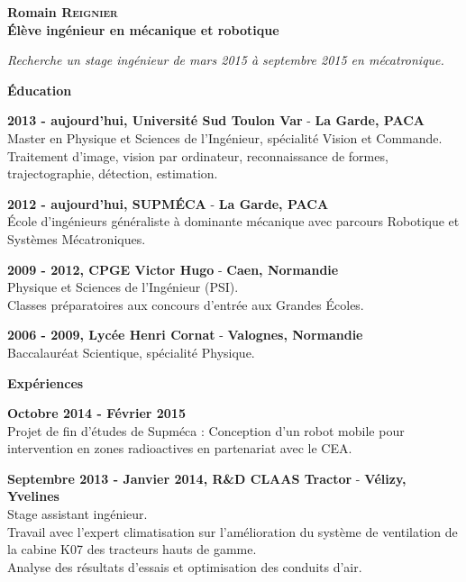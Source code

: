 \documentclass[a4paper,11pt,final]{memoir}
\newcommand{\Sep}{\vspace{1.5em}}
\newcommand{\SmallSep}{\vspace{0.5em}}
\newenvironment{AboutMe}
	{\ignorespaces%
}
	{\Sep\ignorespacesafterend}
\newcommand{\CVSection}[1]
	{\Large\textbf{#1}\par
	\SmallSep\normalsize\normalfont}
\newcommand{\CVItem}[1]
	{\textbf{\color{RoyalBlue} #1}\normalsize\normalfont}
\newcommand{\city}[1]
	{{\small\textbf{#1}}\normalsize\normalfont}
\begin{document}
\Huge\bfseries {\color{RoyalBlue} Romain \textsc{Reignier}} \\
\Large\bfseries  Élève ingénieur en mécanique et robotique\\

\normalsize\normalfont

\begin{AboutMe}
\emph{Recherche un stage ingénieur de mars 2015 à septembre 2015 en mécatronique.}
\end{AboutMe}

\CVSection{Éducation}

\CVItem{2013 - aujourd'hui, Université Sud Toulon Var} - \city{La Garde, PACA}\\
Master en Physique et Sciences de l'Ingénieur, spécialité Vision et Commande.\\
Traitement d'image, vision par ordinateur, reconnaissance de formes, trajectographie, détection, estimation.\\
\SmallSep

\CVItem{2012 - aujourd'hui, SUPMÉCA} - \city{La Garde, PACA}\\
École d'ingénieurs généraliste à dominante mécanique avec parcours Robotique et Systèmes Mécatroniques.
\SmallSep

\CVItem{2009 - 2012, CPGE Victor Hugo} - \city{Caen, Normandie}\\
Physique et Sciences de l'Ingénieur (PSI).\\
Classes préparatoires aux concours d'entrée aux Grandes Écoles.
\SmallSep

\CVItem{2006 - 2009, Lycée Henri Cornat} - \city{Valognes, Normandie}\\
Baccalauréat Scientique, spécialité Physique.
\Sep

\CVSection{Expériences}

\CVItem{Octobre 2014 - Février 2015}\\
Projet de fin d'études de Supméca : Conception d'un robot mobile pour intervention en zones radioactives en partenariat avec le CEA.
\SmallSep

\CVItem{Septembre 2013 - Janvier 2014, R\&D CLAAS Tractor} - \city{Vélizy, Yvelines}\\
Stage assistant ingénieur.\\
Travail avec l'expert climatisation sur l'amélioration du système de ventilation de la cabine K07 des tracteurs hauts de gamme.\\
Analyse des résultats d'essais et optimisation des conduits d'air.
\SmallSep
\end{document}
